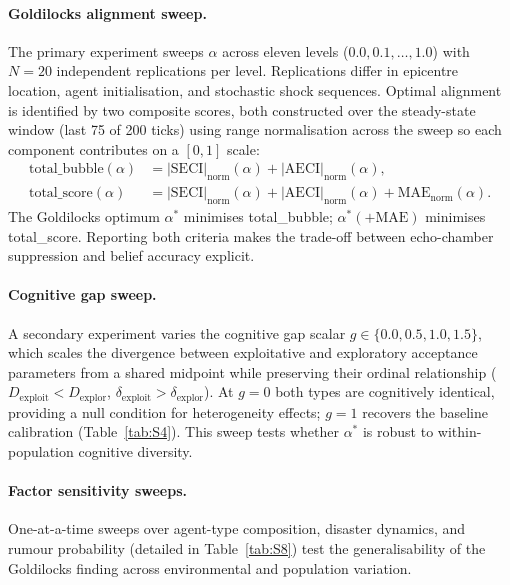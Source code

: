 \documentclass[pdflatex,sn-apa]{sn-jnl}%
\begin{document}
\paragraph{Goldilocks alignment sweep.}
The primary experiment sweeps $\alpha$ across eleven levels ($0.0,0.1,\ldots,1.0$)
with $N=20$ independent replications per level.
Replications differ in epicentre location, agent initialisation, and stochastic
shock sequences.
Optimal alignment is identified by two composite scores, both constructed over the
steady-state window (last 75 of 200 ticks) using range normalisation across the
sweep so each component contributes on a $[0,1]$ scale:
%
\begin{align}
  \text{total\_bubble}(\alpha)
    &= |\mathrm{SECI}|_{\mathrm{norm}}(\alpha)
       + |\mathrm{AECI}|_{\mathrm{norm}}(\alpha), \label{eq:bubble}\\
  \text{total\_score}(\alpha)
    &= |\mathrm{SECI}|_{\mathrm{norm}}(\alpha)
       + |\mathrm{AECI}|_{\mathrm{norm}}(\alpha)
       + \mathrm{MAE}_{\mathrm{norm}}(\alpha). \label{eq:score}
\end{align}
%
The Goldilocks optimum $\alpha^*$ minimises total\_bubble; $\alpha^*(+\mathrm{MAE})$
minimises total\_score.
Reporting both criteria makes the trade-off between echo-chamber suppression and
belief accuracy explicit.

\paragraph{Cognitive gap sweep.}
A secondary experiment varies the cognitive gap scalar $g\in\{0.0,0.5,1.0,1.5\}$,
which scales the divergence between exploitative and exploratory acceptance
parameters from a shared midpoint while preserving their ordinal relationship
($D_{\mathrm{exploit}}<D_{\mathrm{explor}}$,
$\delta_{\mathrm{exploit}}>\delta_{\mathrm{explor}}$).
At $g=0$ both types are cognitively identical, providing a null condition for
heterogeneity effects; $g=1$ recovers the baseline calibration
(Table~\ref{tab:S4}).
This sweep tests whether $\alpha^*$ is robust to within-population cognitive
diversity.

\paragraph{Factor sensitivity sweeps.}
One-at-a-time sweeps over agent-type composition, disaster dynamics, and rumour
probability (detailed in Table~\ref{tab:S8}) test the generalisability of the
Goldilocks finding across environmental and population variation.
\end{document}
